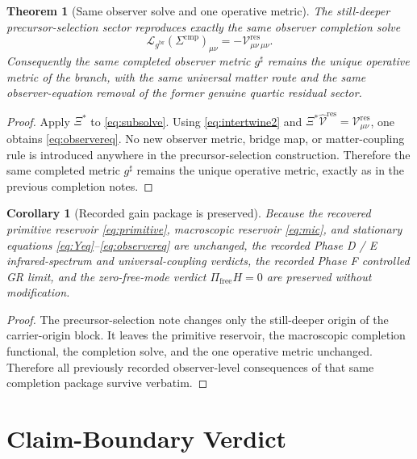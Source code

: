 \documentclass[11pt]{article}
\newcommand{\ObserverMap}{\Xi}
\newcommand{\ObserverMetric}{g^{\mathrm{br}}}
\newcommand{\CompletedMetric}{g^{\sharp}}
\newcommand{\CompShift}{\Sigma^{\mathrm{cmp}}}
\newcommand{\ResidualCore}{\mathcal V_{\mu\nu}^{\mathrm{res}}}
\newcommand{\ResidualLift}{\widehat{\mathcal V}^{\mathrm{res}}}
\newcommand{\ReducedEin}{\mathcal L_{\ObserverMetric}}
\newtheorem{corollary}{Corollary}
\newtheorem{theorem}{Theorem}
\begin{document}
\begin{theorem}[Same observer solve and one operative metric]
\label{thm:observer}
The still-deeper precursor-selection sector reproduces exactly the same observer completion solve
\begin{equation}
\ReducedEin(\CompShift)_{\mu\nu}
=
-\ResidualCore{}_{\mu\nu}.
\label{eq:observereq}
\end{equation}
Consequently the same completed observer metric \(\CompletedMetric\) remains the unique operative metric of the branch, with the same universal matter route and the same observer-equation removal of the former genuine quartic residual sector.
\end{theorem}

\begin{proof}
Apply \(\ObserverMap^*\) to \eqref{eq:subsolve}. Using \eqref{eq:intertwine2} and \(\ObserverMap^*\ResidualLift=\ResidualCore\), one obtains \eqref{eq:observereq}. No new observer metric, bridge map, or matter-coupling rule is introduced anywhere in the precursor-selection construction. Therefore the same completed metric \(\CompletedMetric\) remains the unique operative metric, exactly as in the previous completion notes.
\end{proof}

\begin{corollary}[Recorded gain package is preserved]
\label{cor:gains}
Because the recovered primitive reservoir \eqref{eq:primitive}, macroscopic reservoir \eqref{eq:mic}, and stationary equations \eqref{eq:Yeq}--\eqref{eq:observereq} are unchanged, the recorded Phase D / E infrared-spectrum and universal-coupling verdicts, the recorded Phase F controlled GR limit, and the zero-free-mode verdict \(\Pi_{\mathrm{free}}H=0\) are preserved without modification.
\end{corollary}

\begin{proof}
The precursor-selection note changes only the still-deeper origin of the carrier-origin block. It leaves the primitive reservoir, the macroscopic completion functional, the completion solve, and the one operative metric unchanged. Therefore all previously recorded observer-level consequences of that same completion package survive verbatim.
\end{proof}

\section{Claim-Boundary Verdict}
\end{document}
